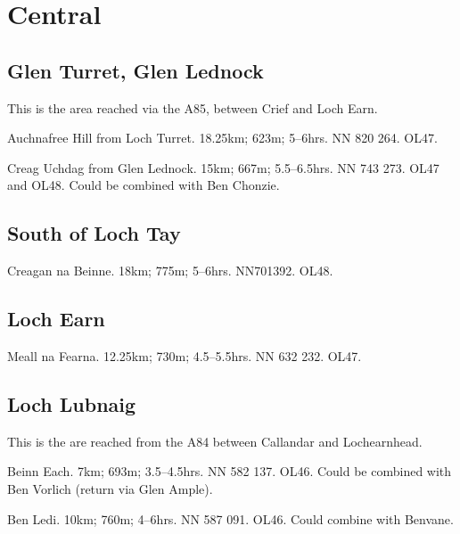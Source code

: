 \section{Central}

\subsection{Glen Turret, Glen Lednock}

This is the area reached via the A85, between Crief and Loch Earn. 
%
\begin{munros}
\item
Auchnafree Hill from Loch Turret.  18.25km; 623m; 5--6hrs.  NN 820 264.  OL47.

\item
Creag Uchdag from Glen Lednock.  15km; 667m; 5.5--6.5hrs.  NN 743 273.  OL47
and OL48.  Could be combined with Ben Chonzie.  
\end{munros}


\subsection{South of Loch Tay}

\begin{munros}
\item
Creagan na Beinne.  18km; 775m; 5--6hrs.  NN701392.  OL48.
\end{munros}


\subsection{Loch Earn}

\begin{munros}
\item
Meall na Fearna.  12.25km; 730m; 4.5--5.5hrs.  NN 632 232.  OL47. 
\end{munros}


\subsection{Loch Lubnaig}

This is the are reached from the A84 between Callandar and Lochearnhead.  
%
\begin{munros}
\item
Beinn Each.  7km; 693m; 3.5--4.5hrs.  NN 582 137.  OL46. Could be
combined with Ben Vorlich (return via Glen Ample). 

\item
Ben Ledi.  10km; 760m; 4--6hrs.  NN 587 091.  OL46.  Could combine with
Benvane. 
\end{munros}

